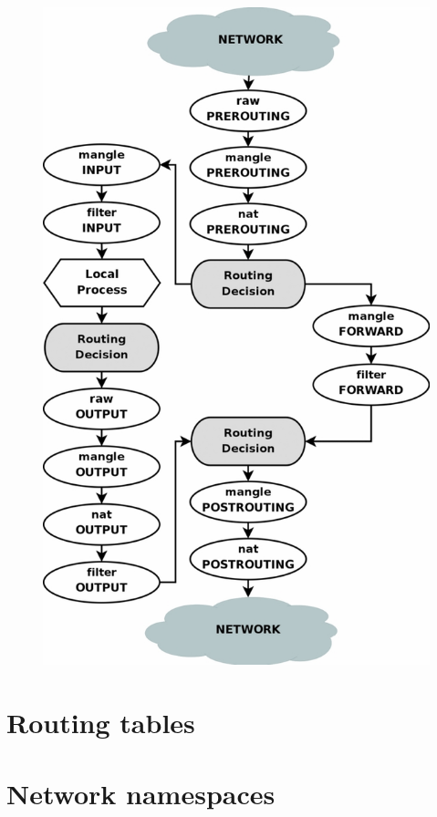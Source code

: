 \documentclass[times, utf8, seminar, english]{fer}
\begin{document}
\begin{figure}
    \label{fig:iptables_traverse}
    \centering
    \includegraphics[width=\textwidth]{tables_traverse}
    \caption{\cite{Iptables99:online}}
\end{figure}

\section{Routing tables}
\section{Network namespaces}
\end{document}
